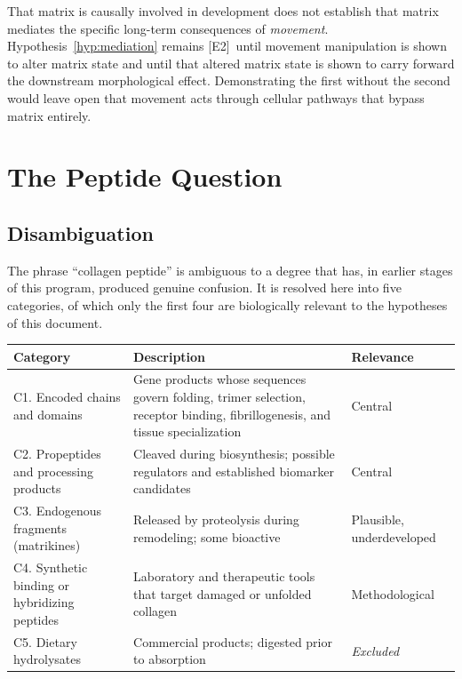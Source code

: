 \documentclass[11pt,a4paper]{article}
\theoremstyle{plain}
\theoremstyle{definition}
\theoremstyle{remark}
\newcommand{\tier}[1]{\textup{\textsc{[#1]}}}
\newcommand{\Etwo}{\tier{E2}}
\begin{document}
\begin{caution}
That matrix is causally involved in development does not establish that matrix mediates the specific long-term consequences of \emph{movement}. Hypothesis~\ref{hyp:mediation} remains \Etwo\ until movement manipulation is shown to alter matrix state and until that altered matrix state is shown to carry forward the downstream morphological effect. Demonstrating the first without the second would leave open that movement acts through cellular pathways that bypass matrix entirely.
\end{caution}

\section{The Peptide Question}\label{sec:peptide}

\subsection{Disambiguation}

The phrase ``collagen peptide'' is ambiguous to a degree that has, in earlier stages of this program, produced genuine confusion. It is resolved here into five categories, of which only the first four are biologically relevant to the hypotheses of this document.

\begin{center}
\small
\begin{tabularx}{\textwidth}{@{}>{\raggedright\arraybackslash}p{}>{\raggedright\arraybackslash}X>{\raggedright\arraybackslash}p{}@{}}
\toprule
\textbf{Category} & \textbf{Description} & \textbf{Relevance} \\
\midrule
C1. Encoded chains and domains & Gene products whose sequences govern folding, trimer selection, receptor binding, fibrillogenesis, and tissue specialization & Central \\
C2. Propeptides and processing products & Cleaved during biosynthesis; possible regulators and established biomarker candidates & Central \\
C3. Endogenous fragments (matrikines) & Released by proteolysis during remodeling; some bioactive \cite{maquart2005} & Plausible, underdeveloped \\
C4. Synthetic binding or hybridizing peptides & Laboratory and therapeutic tools that target damaged or unfolded collagen & Methodological \\
C5. Dietary hydrolysates & Commercial products; digested prior to absorption & \emph{Excluded} \\
\bottomrule
\end{tabularx}
\end{center}
\end{document}
